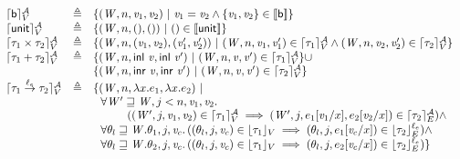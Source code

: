 \begin{figure*}[!htbp]
\begin{displaymath}
  \begin{array}{lll}
    \lceil \mathsf{b} \rceil_{V}^{\mathcal{A}} & \triangleq & \{(\mathit{W}, n, \mathit{v}_1, \mathit{v}_2) ~|~ \mathit{v}_1 = \mathit{v}_2 \wedge \{\mathit{v}_1,\mathit{v}_2\}
                                  \in \llbracket \mathsf{b} \rrbracket \} \\

    \lceil \mathsf{unit} \rceil_{V}^{\mathcal{A}} & \triangleq & \{(\mathit{W}, n, (), ()) ~|~  () \in \llbracket \mathsf{unit} \rrbracket \} \\

    \lceil \tau_1 \times \tau_2 \rceil_{V}^{\mathcal{A}} & \triangleq & \{(\mathit{W}, n, (\mathit{v}_1, \mathit{v}_2), (\mathit{v}_1', \mathit{v}_2')) ~|~
                                                (\mathit{W}, n, \mathit{v}_1, \mathit{v}_1') \in \lceil \tau_1 \rceil_{V}^{\mathcal{A}} \wedge
                                                (\mathit{W}, n, \mathit{v}_2, \mathit{v}_2') \in \lceil \tau_2 \rceil_{V}^{\mathcal{A}}
                                                \} \\

    \lceil \tau_1 + \tau_2 \rceil_{V}^{\mathcal{A}} & \triangleq & \{(\mathit{W}, n, \mathsf{inl} ~  \mathit{v}, \mathsf{inl} ~  \mathit{v}') ~|~
                                           (\mathit{W}, n, \mathit{v}, \mathit{v}') \in \lceil \tau_1 \rceil_{V}^{\mathcal{A}}
                                           \} \cup\\
                   & & \{(\mathit{W}, n, \mathsf{inr} ~  \mathit{v}, \mathsf{inr} ~  \mathit{v}') ~|~
                       (\mathit{W}, n, \mathit{v}, \mathit{v}') \in \lceil \tau_2 \rceil_{V}^{\mathcal{A}}
                       \} \\

    \lceil \tau_1 \overset{\ell_e}\to \tau_2 \rceil_{V}^{\mathcal{A}} & \triangleq & \{(\mathit{W}, n, \lambda x. e_1, \lambda x. e_2) ~|~\\
                   & & ~~\forall \mathit{W}' \sqsupseteq \mathit{W}, j < n, \mathit{v}_1, \mathit{v}_2.\\
                   & & ~~~~~~~~~((\mathit{W}', j, \mathit{v}_1, \mathit{v}_2) \in \lceil \tau_1 \rceil_{V}^{\mathcal{A}}
                       \implies (\mathit{W}', j, e_1[\mathit{v}_1/x], e_2[\mathit{v}_2/x]) \in \lceil \tau_2 \rceil_{E}^{\mathcal{A}} ) \wedge \\
                   & & ~~\forall \theta_l \sqsupseteq \mathit{W}.\theta_1, j, \mathit{v}_c.
                   \, ((\theta_l, j, \mathit{v}_c) \in \lfloor \tau_1 \rfloor_{V} \implies
                       (\theta_l, j, e_1[\mathit{v}_c/x]) \in \lfloor \tau_2 \rfloor_{E}^{\ell_e}) \wedge  \\
                   & & ~~\forall \theta_l \sqsupseteq \mathit{W}.\theta_2, j, \mathit{v}_c.
                   \, ((\theta_l, j, \mathit{v}_c) \in \lfloor \tau_1 \rfloor_{V} \implies
                       (\theta_l, j, e_2[\mathit{v}_c/x]) \in \lfloor \tau_2 \rfloor_{E}^{\ell_e}) \} \\


\end{array}
\end{displaymath}
\end{figure*}
